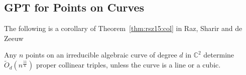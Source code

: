 \subsection{GPT for Points on Curves}%
\label{sec:paper:3pol-algorithm:application:gpt}


The following is a corollary of Theorem~\ref{thm:rsz15:col} in Raz, Sharir and de Zeeuw~\cite{RSZ15}
\begin{corollary}
	Any $n$ points on an irreducible algebraic curve of degree $d$ in
	$\mathbb{C}^2$ determine
	$\tilde{O}_d(n^{\frac{11}{6}})$ proper collinear triples, unless the curve is a line or a cubic.
\end{corollary}

